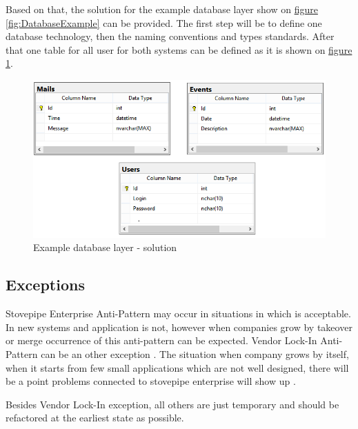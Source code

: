 \newpage
Based on that, the solution for the example database layer show on \hyperref[fig:DatabaseExample]{figure \ref{fig:DatabaseExample}} can be provided.
The first step will be to define one database technology, then the naming conventions and types standards. After that one table for all user for both systems can be defined as it is shown on \hyperref[fig:DatabaseExample]{figure \ref{fig:DatabaseExampleSolution}}.

\begin{figure}[!h]
    \centering
    \includegraphics[width=\textwidth]{Images/sesolution.png}
    \caption[Example database layer - solution]{Example database layer - solution}
    \label{fig:DatabaseExampleSolution}
\end{figure}


\subsection{Exceptions}

Stovepipe Enterprise Anti-Pattern may occur in situations in which is acceptable.
In new systems and application is not, however when companies grow by takeover or merge occurrence of this anti-pattern can be expected. Vendor Lock-In Anti-Pattern can be an other exception \cite{SurvivalGuide}.
The situation when company grows by itself, when it starts from few small applications which are not well designed, there will be a point problems connected to stovepipe enterprise will show up \cite{Dragon}.

Besides Vendor Lock-In exception, all others are just temporary and should be refactored at the earliest state as possible.